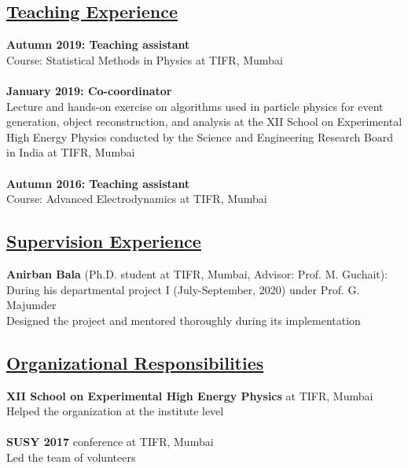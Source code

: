 \documentclass[a4paper,11pt]{article}
\begin{document}
{\subsection*{\underline{Teaching Experience}}

\textbf{Autumn 2019: Teaching assistant}\\
Course: Statistical Methods in Physics at TIFR, Mumbai \\
\\
\textbf{January 2019: Co-coordinator}\\
Lecture and hands-on exercise on algorithms used in particle physics for event generation, object reconstruction, and analysis
at the XII School on Experimental High Energy Physics conducted by the Science and Engineering Research Board in India at TIFR, Mumbai \\
\\
\textbf{Autumn 2016: Teaching assistant}\\
Course: Advanced Electrodynamics at TIFR, Mumbai\\

\subsection*{\underline{Supervision Experience}}

\textbf{Anirban Bala} (Ph.D. student at TIFR, Mumbai, Advisor: Prof. M. Guchait):\\
During his departmental project I (July-September, 2020) under Prof. G. Majumder \\
Designed the project and mentored thoroughly during its implementation\\

\subsection*{\underline{Organizational Responsibilities}}

\textbf{XII School on Experimental High Energy Physics} at TIFR, Mumbai\\
Helped the organization at the institute level\\
\\
\textbf{SUSY 2017} conference at TIFR, Mumbai\\
Led the team of volunteers \\

}
\end{document}
